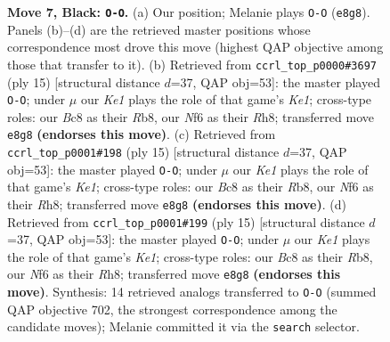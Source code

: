 \documentclass[11pt]{article}
\begin{document}
\begin{figure}[p]
\caption{\textbf{Move 7, Black: \texttt{O-O}.} (a) Our position; Melanie plays \texttt{O-O} (\texttt{e8g8}). Panels (b)--(d) are the retrieved master positions whose correspondence most drove this move (highest QAP objective among those that transfer to it). (b) Retrieved from \texttt{ccrl\_top\_p0000\#3697} (ply 15) [structural distance $d$=37, QAP obj=53]: the master played \texttt{O-O}; under $\mu$ our \emph{Ke1} plays the role of that game's \emph{Ke1}; cross-type roles: our \emph{B}c8 as their \emph{R}b8, our \emph{N}f6 as their \emph{R}h8; transferred move \texttt{e8g8} \textbf{(endorses this move)}. (c) Retrieved from \texttt{ccrl\_top\_p0001\#198} (ply 15) [structural distance $d$=37, QAP obj=53]: the master played \texttt{O-O}; under $\mu$ our \emph{Ke1} plays the role of that game's \emph{Ke1}; cross-type roles: our \emph{B}c8 as their \emph{R}b8, our \emph{N}f6 as their \emph{R}h8; transferred move \texttt{e8g8} \textbf{(endorses this move)}. (d) Retrieved from \texttt{ccrl\_top\_p0001\#199} (ply 15) [structural distance $d$=37, QAP obj=53]: the master played \texttt{O-O}; under $\mu$ our \emph{Ke1} plays the role of that game's \emph{Ke1}; cross-type roles: our \emph{B}c8 as their \emph{R}b8, our \emph{N}f6 as their \emph{R}h8; transferred move \texttt{e8g8} \textbf{(endorses this move)}. Synthesis: 14 retrieved analogs transferred to \texttt{O-O} (summed QAP objective 702, the strongest correspondence among the candidate moves); Melanie committed it via the \texttt{search} selector.}
\label{fig:thought-m13}
\end{figure}

\clearpage
\end{document}
